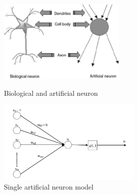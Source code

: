 \begin{figure}[H]
	\centering
	\includegraphics[height=4cm]{images/Fig-1-Analogy-between-artificial-neuron-and-biological-neuron.png}
	\caption{Biological and artificial neuron\protect\footnotemark}
	\label{fig:artifical_and_biological}
	\endminipage\hfill
	\includegraphics[height=4cm]{images/artificial_neuron.png}
	\caption{Single artificial neuron model}
	\label{fig:artificial_neuron}
	\endminipage
\end{figure}

